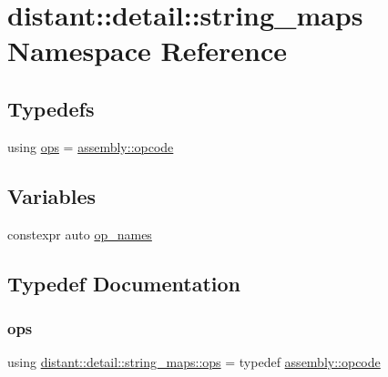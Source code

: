 \hypertarget{namespacedistant_1_1detail_1_1string__maps}{}\section{distant\+:\+:detail\+:\+:string\+\_\+maps Namespace Reference}
\label{namespacedistant_1_1detail_1_1string__maps}
\subsection*{Typedefs}
\begin{DoxyCompactItemize}
\item 
using \mbox{\hyperlink{namespacedistant_1_1detail_1_1string__maps_a930cf3a92d1b896ef3a9df1b87d7b486}{ops}} = \mbox{\hyperlink{namespacedistant_1_1assembly_a64d7b047d9e3df1ac04919f7c4f8f6fa}{assembly\+::opcode}}
\end{DoxyCompactItemize}
\subsection*{Variables}
\begin{DoxyCompactItemize}
\item 
constexpr auto \mbox{\hyperlink{namespacedistant_1_1detail_1_1string__maps_ad02172ce1c65de2e0203811378a9000a}{op\+\_\+names}}
\end{DoxyCompactItemize}


\subsection{Typedef Documentation}
\mbox{\label{namespacedistant_1_1detail_1_1string__maps_a930cf3a92d1b896ef3a9df1b87d7b486}} 
\subsubsection{\texorpdfstring{ops}{ops}}
{\footnotesize\ttfamily using \mbox{\hyperlink{namespacedistant_1_1assembly_a64d7b047d9e3df1ac04919f7c4f8f6fa}{distant\+::detail\+::string\+\_\+maps\+::ops}} = typedef \mbox{\hyperlink{namespacedistant_1_1assembly_a64d7b047d9e3df1ac04919f7c4f8f6fa}{assembly\+::opcode}}}



